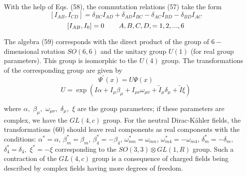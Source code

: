 \documentclass[a4paper,12pt]{article}
\begin{document}
With the help of Eqs. (58), the commutation relations (57) take the form
\[
\left[ I_{AB},I_{CD}\right] =\delta _{BC}I_{AD}+\delta _{AD}I_{BC}-\delta
_{AC}I_{BD}-\delta _{BD}I_{AC}
\]
\begin{equation}
\left[ I_{AB},I_0\right] =0\hspace{0.3in}A,B,C,D,=1, 2,...,6
\label{59}
\end{equation}

The algebra (59) corresponds with the direct product of the group
of $6-$ dimensional rotation $SO(6,6)$ and the unitary group
$U(1)$ (for real group parameters). This group is isomorphic to
the $U(4)$ group. The transformations of the corresponding group
are given by
\[
\Psi ^{\prime }(x)=U\Psi (x)
\]
\begin{equation}
U=\exp \left( I\alpha +I_\mu \beta _\mu +I_{\mu \nu }\omega _{\mu
\nu }+ \widetilde{I}_\mu \delta _\mu +\widetilde{I}\xi \right)
\label{60}
\end{equation}

where $\alpha ,$ $\beta _\mu ,$ $\omega _{\mu \nu },$ $\delta _\mu
,$ $\xi $ are the group parameters; if these parameters are
complex, we have the $ GL(4,c)$ group. For the neutral
Dirac-K\"ahler fields, the transformations (60) should leave real
components as real components with the conditions: $ \alpha
^{*}=\alpha $, $\beta _m^{*}=\beta _m$, $\beta _4^{*}=-\beta _4$,
$ \omega _{mn}^{*}=\omega _{mn}$, $\omega _{m4}^{*}=-\omega
_{m4}$, $\delta _m^{*}=-\delta _m,$ $\delta _4^{*}=\delta _4,$
$\xi ^{*}=-\xi $ corresponding to the $SO(3,3)\otimes GL(1,R)$
group. Such a contraction of the $GL(4,c)$ group is a consequence
of charged fields being described by complex fields having more
degrees of freedom.
\end{document}
